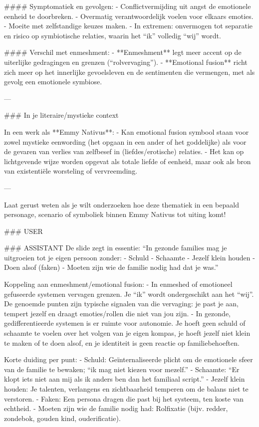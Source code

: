 \#\#\#\# Symptomatiek en gevolgen:
- Conflictvermijding uit angst de emotionele eenheid te doorbreken.
- Overmatig verantwoordelijk voelen voor elkaars emoties.
- Moeite met zelfstandige keuzes maken.
- In extremen: onvermogen tot separatie en risico op symbiotische relaties, waarin het “ik” volledig “wij” wordt.

\#\#\#\# Verschil met enmeshment:
- **Enmeshment** legt meer accent op de uiterlijke gedragingen en grenzen (“rolvervaging”).
- **Emotional fusion** richt zich meer op het innerlijke gevoelsleven en de sentimenten die vermengen, met als gevolg een emotionele symbiose.

---

\#\#\# In je literaire/mystieke context

In een werk als **Emmy Nativus**:
- Kan emotional fusion symbool staan voor zowel mystieke eenwording (het opgaan in een ander of het goddelijke) als voor de gevaren van verlies van zelfbesef in (liefdes/erotische) relaties.
- Het kan op lichtgevende wijze worden opgevat als totale liefde of eenheid, maar ook als bron van existentiële worsteling of vervreemding.

---

Laat gerust weten als je wilt onderzoeken hoe deze thematiek in een bepaald personage, scenario of symboliek binnen Emmy Nativus tot uiting komt!

\#\#\# USER

\#\#\# ASSISTANT
De slide zegt in essentie:
“In gezonde families mag je uitgroeien tot je eigen persoon zonder:
- Schuld
- Schaamte
- Jezelf klein houden
- Doen alsof (faken)
- Moeten zijn wie de familie nodig had dat je was.”

Koppeling aan enmeshment/emotional fusion:
- In enmeshed of emotioneel gefuseerde systemen vervagen grenzen. Je “ik” wordt ondergeschikt aan het “wij”. De genoemde punten zijn typische signalen van die vervaging: je past je aan, tempert jezelf en draagt emoties/rollen die niet van jou zijn.
- In gezonde, gedifferentieerde systemen is er ruimte voor autonomie. Je hoeft geen schuld of schaamte te voelen over het volgen van je eigen kompas, je hoeft jezelf niet klein te maken of te doen alsof, en je identiteit is geen reactie op familiebehoeften.

Korte duiding per punt:
- Schuld: Geïnternaliseerde plicht om de emotionele sfeer van de familie te bewaken; “ik mag niet kiezen voor mezelf.”
- Schaamte: “Er klopt iets niet aan mij als ik anders ben dan het familiaal script.”
- Jezelf klein houden: Je talenten, verlangens en zichtbaarheid temperen om de balans niet te verstoren.
- Faken: Een persona dragen die past bij het systeem, ten koste van echtheid.
- Moeten zijn wie de familie nodig had: Rolfixatie (bijv. redder, zondebok, gouden kind, ouderificatie).

